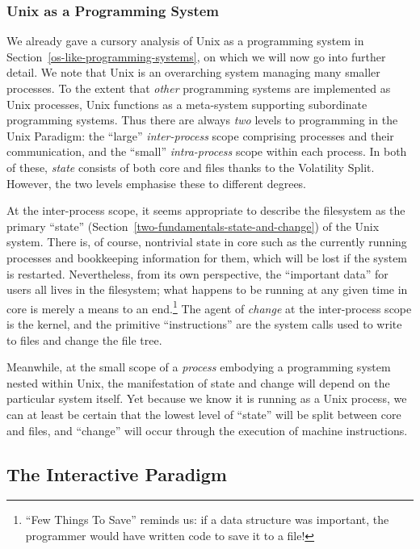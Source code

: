 \documentclass[ twoside,openright,titlepage,numbers=noenddot,headinclude,footinclude,cleardoublepage=empty,abstract=on,
                BCOR=5mm,paper=a4,fontsize=11pt
                ]{scrreprt}
\theoremstyle{definition}
\begin{document}
\hypertarget{unix-as-a-programming-system}{\subsubsection{Unix as a Programming
System}\label{unix-as-a-programming-system}}

We already gave a cursory analysis of Unix as a programming system in
Section~\ref{os-like-programming-systems}, on which we will now go into
further detail. We note that Unix is an overarching system managing many
smaller processes. To the extent that \emph{other} programming systems
are implemented as Unix processes, Unix functions as a meta-system
supporting subordinate programming systems. Thus there are always
\emph{two} levels to programming in the Unix Paradigm: the ``large''
\emph{inter-process} scope comprising processes and their communication,
and the ``small'' \emph{intra-process} scope within each process. In
both of these, \emph{state} consists of both core and files thanks to
the Volatility Split. However, the two levels emphasise these to
different degrees.

At the inter-process scope, it seems appropriate to describe the
filesystem as the primary ``state''
(Section~\ref{two-fundamentals-state-and-change}) of the Unix system.
There is, of course, nontrivial state in core such as the currently
running processes and bookkeeping information for them, which will be
lost if the system is restarted. Nevertheless, from its own perspective,
the ``important data'' for users all lives in the filesystem; what
happens to be running at any given time in core is merely a means to an
end.\footnote{``Few Things To Save'' reminds us: if a data structure was
  important, the programmer would have written code to save it to a
  file!} The agent of \emph{change} at the inter-process scope is the
kernel, and the primitive ``instructions'' are the system calls used to
write to files and change the file tree.

Meanwhile, at the small scope of a \emph{process} embodying a
programming system nested within Unix, the manifestation of state and
change will depend on the particular system itself. Yet because we know
it is running as a Unix process, we can at least be certain that the
lowest level of ``state'' will be split between core and files, and
``change'' will occur through the execution of machine instructions.

\hypertarget{the-interactive-paradigm}{\subsection{The Interactive Paradigm}\label{the-interactive-paradigm}}
\end{document}
